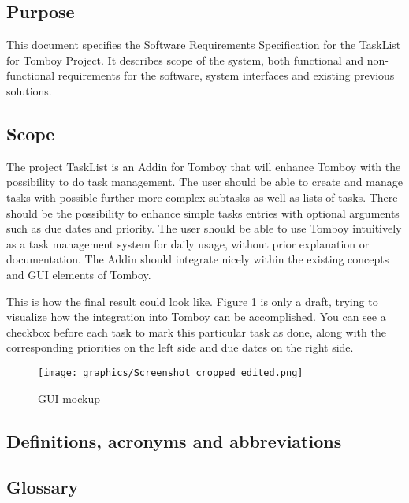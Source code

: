 \subsection{Purpose}
\label{intro:purpose}
This document specifies the Software Requirements Specification for the TaskList for Tomboy Project.
It describes scope of the system, both functional and non-functional requirements for the software, system interfaces and existing previous solutions.


\subsection{Scope}
\label{intro:scope}
The project TaskList is an Addin for Tomboy that will enhance Tomboy with the possibility to do task management. The user should be able to create and manage tasks with possible further more complex subtasks as well as lists of tasks.
There should be the possibility to enhance simple tasks entries with optional arguments such as due dates and priority.
The user should be able to use Tomboy intuitively as a task management system for daily usage, without prior explanation or documentation. The Addin should integrate nicely within the existing concepts and GUI elements of Tomboy.

This is how the final result could look like. Figure \ref{gui} is only a draft, trying to visualize how the integration into Tomboy can be accomplished. You can see a checkbox before each task to mark this particular task as done, along with the corresponding priorities on the left side and due dates on the right side.
\begin{figure}[h]
  \texttt{[image: graphics/Screenshot\_cropped\_edited.png]}
  \caption{GUI mockup}
  \label{gui}
\end{figure}


\subsection{Definitions, acronyms and abbreviations}
\label{intro:definitions}

\begin{objects}
\end{objects}


\subsection{Glossary}
\label{intro:glossary}

